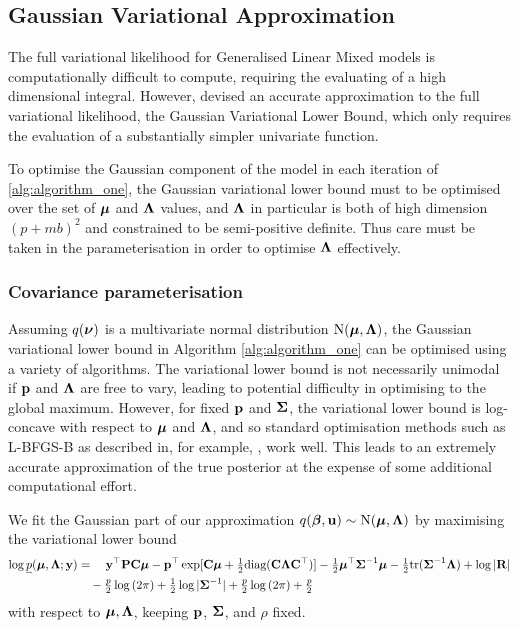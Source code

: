 \documentclass{amsart}[12pt]
\begin{document}
	\subsection{Gaussian Variational Approximation}
		
		
	The full variational likelihood for Generalised Linear Mixed models is computationally difficult to compute,
	requiring the evaluating of a high dimensional integral. However, \citep{ormerod09} devised an accurate
	approximation to the full variational likelihood, the Gaussian Variational Lower Bound, which only requires the 
	evaluation of a substantially simpler univariate function.
	
	To optimise the Gaussian component of the model in each iteration of \ref{alg:algorithm_one}, the Gaussian variational lower bound must to be optimised over the set of ${\boldsymbol \mu}$ and ${\boldsymbol \Lambda}$
	values, and ${\boldsymbol \Lambda}$ in particular is both of high dimension $(p + mb)^2$ and constrained to be
	semi-positive definite. Thus care must be taken in the parameterisation in order to optimise
	${\boldsymbol \Lambda}$ effectively.
	
	\subsubsection{Covariance parameterisation}

	Assuming $q({\boldsymbol \nu})$ is a multivariate normal distribution $\text{N}({\boldsymbol \mu}, {\boldsymbol \Lambda})$, the Gaussian variational lower
	bound in Algorithm \ref{alg:algorithm_one} can be optimised using a variety of algorithms. The variational
	lower bound is not necessarily unimodal if ${\bf p}$ and ${\boldsymbol \Lambda}$ are free to vary, leading to potential
	difficulty in optimising to the global maximum. However, for fixed ${\bf p}$ and ${\boldsymbol \Sigma}$, the variational
	lower bound is log-concave with respect to ${\boldsymbol \mu}$ and ${\boldsymbol \Lambda}$, and so standard optimisation methods such
	as L-BFGS-B as described in, for example, \citep{Liu1989}, work well. This leads to an extremely accurate
	approximation of the true posterior at the expense of some additional computational effort.
		
	We fit the Gaussian part of our approximation $q({\boldsymbol \beta}, {\bf u}) \sim \text{N}({\boldsymbol \mu}, {\boldsymbol \Lambda})$ by maximising 
	the variational lower bound	
	\begin{align*}
		\log \underline{p}({\boldsymbol \mu}, {\boldsymbol \Lambda}; {\bf y}) & = \quad {\bf y}^\top{\bf P} {\bf C} {\boldsymbol\mu} - {\bf p}^\top \exp[{\bf C} {\boldsymbol \mu} + \tfrac{1}{2} \text{diag}({\bf C} {\boldsymbol \Lambda} {\bf C}^\top)] - \tfrac{1}{2} {\boldsymbol \mu}^\top {\boldsymbol\Sigma}^{-1} {\boldsymbol \mu} - \tfrac{1}{2} \text{tr}{({\boldsymbol\Sigma}^{-1} {\boldsymbol\Lambda})} + \log{|{\bf R}|} \\
		                                        & \quad - \tfrac{p}{2} \log{(2 \pi)} + \tfrac{1}{2} \log{|{\boldsymbol\Sigma}^{-1}|} + \tfrac{p}{2} \log{(2 \pi)} + \tfrac{p}{2}                                                                              
	\end{align*}
	\noindent with respect to ${\boldsymbol \mu}, {\boldsymbol \Lambda}$, keeping ${\bf p}$, ${\boldsymbol \Sigma}$, and $\rho$ fixed.
		
\end{document}
